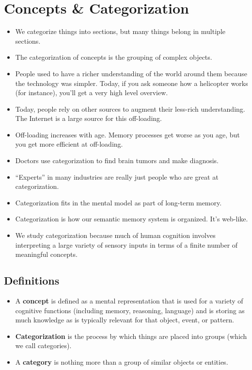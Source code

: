 \documentclass[]{article}
\newcommand{\lecture}[1]{\marginpar{{\footnotesize $\leftarrow$ \underline{#1}}}}
\begin{document}
	\section{Concepts \& Categorization} \lecture{February 26, 2013}
		\begin{itemize}
			\item We categorize things into sections, but many things belong in multiple sections.
			\item The categorization of concepts is the grouping of complex objects.
			\item People used to have a richer understanding of the world around them because the technology was simpler. Today, if you ask someone how a helicopter works (for instance), you'll get a very high level overview.
			\item Today, people rely on other sources to augment their less-rich understanding. The Internet is a large source for this off-loading.
			\item Off-loading increases with age. Memory processes get worse as you age, but you get more efficient at off-loading.
			\item Doctors use categorization to find brain tumors and make diagnosis.
			\item ``Experts'' in many industries are really just people who are great at categorization.
			\item Categorization fits in the mental model as part of long-term memory.
			\item Categorization is how our semantic memory system is organized. It's web-like.
			\item We study categorization because much of human cognition involves interpreting a large variety of sensory inputs in terms of a finite number of meaningful concepts.
		\end{itemize}

		\subsection{Definitions}
			\begin{itemize}
				\item A \textbf{concept} is defined as a mental representation that is used for a variety of cognitive functions (including memory, reasoning, language) and is storing as much knowledge as is typically relevant for that object, event, or pattern.
				\item \textbf{Categorization} is the process by which things are placed into groups (which we call categories).
				\item A \textbf{category} is nothing more than a group of similar objects or entities.
			\end{itemize}
\end{document}
